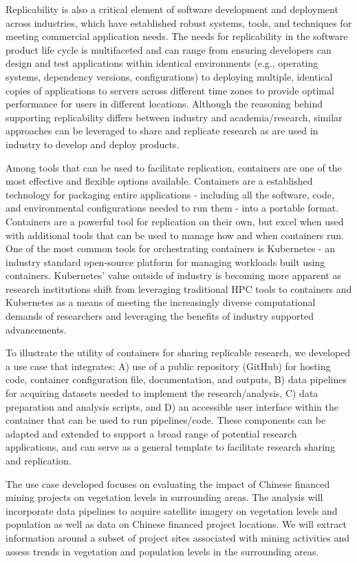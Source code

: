 \documentclass[a4paper]{article}
\begin{document}
Replicability is also a critical element of software development and deployment across industries, which have established robust systems, tools, and techniques for meeting commercial application needs. The needs for replicability in the software product life cycle is multifaceted and can range from ensuring developers can design and test applications within identical environments (e.g., operating systems, dependency versions, configurations) to deploying multiple, identical copies of applications to servers across different time zones to provide optimal performance for users in different locations. Although the reasoning behind supporting replicability differs between industry and academia/research, similar approaches can be leveraged to share and replicate research as are used in industry to develop and deploy products.

Among tools that can be used to facilitate replication, containers are one of the most effective and flexible options available. Containers are a established technology for packaging entire applications - including all the software, code, and environmental configurations needed to run them - into a portable format\citep{containers}. Containers are a powerful tool for replication on their own, but excel when used with additional tools that can be used to manage how and when containers run. One of the most common tools for orchestrating containers is Kubernetes - an industry standard open-source platform for managing workloads built using containers\citep{k8s}. Kubernetes' value outside of industry is becoming more apparent as research institutions shift from leveraging traditional HPC tools to containers and Kubernetes as a means of meeting the increasingly diverse computational demands of researchers and leveraging the benefits of industry supported advancements.

To illustrate the utility of containers for sharing replicable research, we developed a use case that integrates: A) use of a public repository (GitHub) for hosting code, container configuration file, documentation, and outputs, B) data pipelines for acquiring datasets needed to implement the research/analysis, C) data preparation and analysis scripts, and D) an accessible user interface within the container that can be used to run pipelines/code. These components can be adapted and extended to support a broad range of potential research applications, and can serve as a general template to facilitate research sharing and replication.

The use case developed focuses on evaluating the impact of Chinese financed mining projects on vegetation levels in surrounding areas. The analysis will incorporate data pipelines to acquire satellite imagery on vegetation levels and population as well as data on Chinese financed project locations. We will extract information around a subset of project sites associated with mining activities and assess trends in vegetation and population levels in the surrounding areas. 
\end{document}
